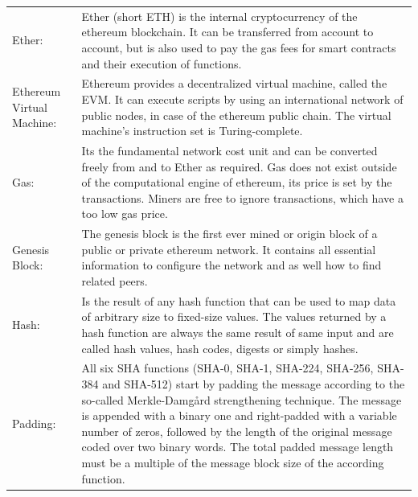 \begin{center}
	\begin{tabular}{ p{4cm} p{8cm} } 
		Ether: & Ether (short ETH) is the internal cryptocurrency of the ethereum blockchain. It can be transferred from account to account, but is also used to pay the gas fees for smart contracts and their execution of functions. \\
		Ethereum Virtual Machine: & Ethereum provides a decentralized virtual machine, called the \ac{EVM}. It can execute scripts by using an international network of public nodes, in case of the ethereum public chain. The virtual machine's instruction set is Turing-complete. \\
		Gas: & Its the fundamental network cost unit and can be converted freely from and to Ether as required. Gas does not exist outside of the computational engine of ethereum, its price is set by the transactions. Miners are free to ignore transactions, which have a too low gas price. \\
		Genesis Block: & The genesis block is the first ever mined or origin block of a public or private ethereum network. It contains all essential information to configure the network and as well how to find related peers. \\
		Hash: & Is the result of any hash function that can be used to map data of arbitrary size to fixed-size values. The values returned by a hash function are always the same result of same input and are called hash values, hash codes, digests or simply hashes. \\
		Padding: & All six SHA functions (SHA-0, SHA-1, SHA-224, SHA-256, SHA-384 and SHA-512) start by padding the message according to the so-called Merkle-Damg{\aa}rd strengthening technique. The message is appended with a binary one and right-padded with a variable number of zeros, followed by the length of the original message coded over two binary words. The total padded message length must be a multiple of the message block size of the according function. \\
	\end{tabular}
\end{center}

\clearpage

